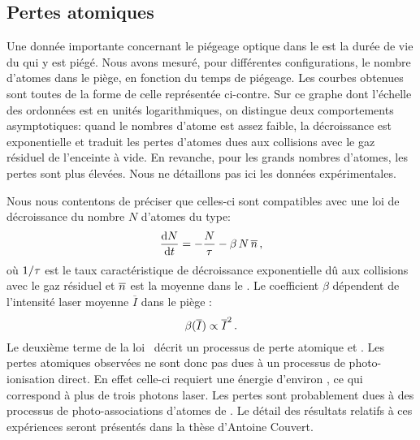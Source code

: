 {\AjouteLigne}

\subsection{Pertes atomiques}
Une donnée importante concernant le piégeage optique dans le \fld est la durée de vie du \nat qui y est piégé. Nous avons mesuré, pour différentes configurations, le nombre d'atomes dans le piège, en fonction du temps de piégeage.
Les courbes obtenues sont toutes de la forme de celle représentée ci-contre. Sur ce graphe dont l'échelle des ordonnées est en unités logarithmiques, on distingue deux comportements asymptotiques: 
	quand le nombres d'atome est assez faible, la décroissance est exponentielle et traduit les pertes d'atomes dues aux collisions avec le gaz résiduel de l'enceinte à vide.
En revanche, pour les grands nombres d'atomes, les pertes sont plus élevées.
\noindent
Nous ne détaillons pas ici les données expérimentales. 

\casse

\noindent
Nous nous contentons de préciser que celles-ci sont compatibles avec une loi de décroissance du nombre $N$ d'atomes du type:
\begin{equation}
	\Derive{N}{t} = - \frac{N}{\tau} - \beta\,N\,\overline{\dens}
\virguleformule
	\label{eq:PertesAtomiques}
\end{equation}
où ${{1} / {\tau}}$ est le taux caractéristique de décroissance exponentielle dû aux collisions avec le gaz résiduel et $\overline{{n}}$ est la \dat moyenne dans le \pd. Le coefficient $\beta$ dépendent de l'intensité laser moyenne $\overline{I}$ dans le piège : 
\[
\beta(\overline{I}) \propto \overline{I}^2
\, .
\]
Le deuxième terme de la loi~ décrit un processus de perte atomique  et . Les pertes atomiques observées ne sont donc pas dues à un processus de photo-ionisation direct. En effet celle-ci requiert une énergie d'environ , ce qui correspond à plus de trois photons laser. Les pertes sont probablement dues à des processus de photo-associations d'atomes de \Rb. 
Le détail des résultats relatifs à ces expériences seront présentés dans la thèse d'Antoine Couvert.



